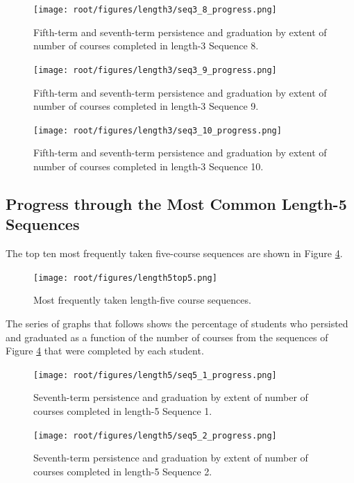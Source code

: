 \begin{figure}[!htbp]
\centering
\texttt{[image: root/figures/length3/seq3\_8\_progress.png]}
\caption{Fifth-term and seventh-term persistence and graduation by extent of number of courses completed in length-3 Sequence 8.}
\label{seq3_8}
\end{figure}

\begin{figure}[!htbp]
\centering
\texttt{[image: root/figures/length3/seq3\_9\_progress.png]}
\caption{Fifth-term and seventh-term persistence and graduation by extent of number of courses completed in length-3 Sequence 9.}
\label{seq3_9}
\end{figure}

\begin{figure}[!htbp]
\centering
\texttt{[image: root/figures/length3/seq3\_10\_progress.png]}
\caption{Fifth-term and seventh-term persistence and graduation by extent of number of courses completed in length-3 Sequence 10.}
\label{seq3_10}
\end{figure}



\pagebreak
\subsection{Progress through the Most Common Length-5 Sequences}

The top ten most frequently taken five-course sequences are shown in Figure \ref{length5top5}.  

\begin{figure}[htbp]
\centering
\texttt{[image: root/figures/length5top5.png]}
\caption{Most frequently taken length-five course sequences.}
\label{length5top5}
\end{figure}

The series of graphs that follows shows the percentage of students who persisted and graduated as a function of the number of courses from the sequences of Figure \ref{length5top5} that were completed by each student.

\begin{figure}[htbp]
\centering
\texttt{[image: root/figures/length5/seq5\_1\_progress.png]}
\caption{Seventh-term persistence and graduation by extent of number of courses completed in length-5 Sequence 1.}
\label{seq5_1}
\end{figure}

\begin{figure}[htbp]
\centering
\texttt{[image: root/figures/length5/seq5\_2\_progress.png]}
\caption{Seventh-term persistence and graduation by extent of number of courses completed in length-5 Sequence 2.}
\label{seq5_2}
\end{figure}

